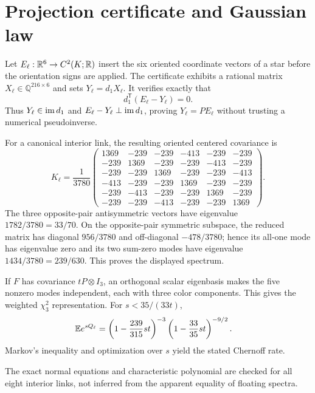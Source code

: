 \section{Projection certificate and Gaussian law}
\label{app:gaussian}

Let $E_\ell:\mathbb{R}^6\to C^2(K;\mathbb{R})$ insert the six oriented coordinate vectors
of a star before the orientation signs are applied.  The certificate exhibits
a rational matrix $X_\ell\in\mathbb Q^{216\times6}$ and sets
$Y_\ell=d_1X_\ell$.  It verifies exactly that
\[
 d_1^\mathsf T(E_\ell-Y_\ell)=0.
\]
Thus $Y_\ell\in\operatorname{im} d_1$ and $E_\ell-Y_\ell\perp\operatorname{im} d_1$, proving
$Y_\ell=PE_\ell$ without trusting a numerical pseudoinverse.

For a canonical interior link, the resulting oriented centered covariance is
\begin{equation}
\label{eq:exact-K}
 K_\ell=\frac1{3780}
 \begin{pmatrix}
1369&-239&-239&-413&-239&-239\\
-239&1369&-239&-239&-413&-239\\
-239&-239&1369&-239&-239&-413\\
-413&-239&-239&1369&-239&-239\\
-239&-413&-239&-239&1369&-239\\
-239&-239&-413&-239&-239&1369
 \end{pmatrix}.
\end{equation}
The three opposite-pair antisymmetric vectors have eigenvalue
$1782/3780=33/70$.  On the opposite-pair symmetric subspace, the reduced
matrix has diagonal $956/3780$ and off-diagonal $-478/3780$; hence its all-one
mode has eigenvalue zero and its two sum-zero modes have eigenvalue
$1434/3780=239/630$.  This proves the displayed spectrum.

If $F$ has covariance $tP\otimes I_3$, an orthogonal scalar eigenbasis makes
the five nonzero modes independent, each with three color components.  This
gives the weighted $\chi^2_3$ representation.  For $s<35/(33t)$,
\begin{align*}
 \mathbb{E} e^{sQ_\ell}
 &=\left(1-\frac{239}{315}st\right)^{-3}
   \left(1-\frac{33}{35}st\right)^{-9/2}.
\end{align*}
Markov's inequality and optimization over $s$ yield the stated Chernoff rate.

The exact normal equations and characteristic polynomial are checked for all
eight interior links, not inferred from the apparent equality of floating
spectra.
